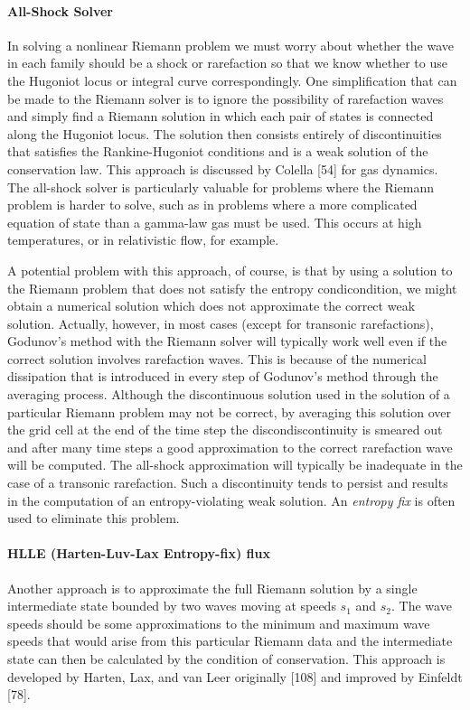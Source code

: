 \paragraph{All-Shock Solver}
In solving a nonlinear Riemann problem we must worry about whether the wave in
each family should be a shock or rarefaction so that we know whether to use the
Hugoniot locus or integral curve correspondingly. One simplification that can
be made to the Riemann solver is to ignore the possibility of rarefaction waves
and simply find a Riemann solution in which each pair of states is
connected along the Hugoniot locus. The solution then consists entirely of
discontinuities that satisfies the Rankine-Hugoniot conditions and is a weak
solution of the conservation law.  This approach is discussed by Colella [54]
for gas dynamics. The all-shock solver is particularly valuable for problems
where the Riemann problem is harder to solve, such as in problems where a more
complicated equation of state than a gamma-law gas must be used. This occurs at
high temperatures, or in relativistic flow, for example.

A potential problem with this approach, of course, is that by using a solution
to the Riemann problem that does not satisfy the entropy condicondition, we
might obtain a numerical solution which does not approximate the correct weak
solution. Actually, however, in most cases (except for transonic rarefactions),
Godunov's method with the Riemann solver will typically work well even if the
correct solution involves rarefaction waves. This is because of the numerical
dissipation that is introduced in every step of Godunov's method through the
averaging process. Although the discontinuous solution used in the solution of
a particular Riemann problem may not be correct, by averaging this solution
over the grid cell at the end of the time step the discondiscontinuity is
smeared out and after many time steps a good approximation to the correct
rarefaction wave will be computed. The all-shock approximation will typically
be inadequate in the case of a transonic rarefaction. Such a discontinuity
tends to persist and results in the computation of an entropy-violating weak
solution. An \emph{entropy fix} is often used to eliminate this problem.

\paragraph {HLLE (Harten-Luv-Lax Entropy-fix) flux}
Another approach is to approximate the full Riemann solution by a single
intermediate state bounded by two waves moving at speeds $s_1$ and $s_2$. The
wave speeds should be some approximations to the minimum and maximum wave
speeds that would arise from this particular Riemann data and the intermediate
state can then be calculated by the condition of conservation. This
approach is developed by Harten, Lax, and van Leer originally [108] and
improved by Einfeldt [78].

